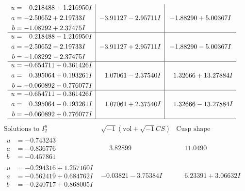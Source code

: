 \documentclass[1p]{elsarticle_modified}
\theoremstyle{definition}
\newcommand{\I}{\sqrt{-1}}
\begin{document}
$$\begin{array}{c|c|c}
\begin{aligned}
u &= \phantom{-}0.218488 + 1.216950 I \\
a &= -2.50652 + 2.19733 I \\
b &= -1.08292 + 2.37475 I\end{aligned}
 & -3.91127 - 2.95711 I & -1.88290 + 5.00367 I \\ \hline\begin{aligned}
u &= \phantom{-}0.218488 - 1.216950 I \\
a &= -2.50652 - 2.19733 I \\
b &= -1.08292 - 2.37475 I\end{aligned}
 & -3.91127 + 2.95711 I & -1.88290 - 5.00367 I \\ \hline\begin{aligned}
u &= -0.654711 + 0.361426 I \\
a &= \phantom{-}0.395064 + 0.193261 I \\
b &= -0.060892 - 0.776077 I\end{aligned}
 & \phantom{-}1.07061 - 2.37540 I & \phantom{-}1.32666 + 13.27884 I \\ \hline\begin{aligned}
u &= -0.654711 - 0.361426 I \\
a &= \phantom{-}0.395064 - 0.193261 I \\
b &= -0.060892 + 0.776077 I\end{aligned}
 & \phantom{-}1.07061 + 2.37540 I & \phantom{-}1.32666 - 13.27884 I\\
 \hline 
 \end{array}$$\newpage$$\begin{array}{c|c|c}  
\text{Solutions to }I^u_{2}& \I (\text{vol} + \sqrt{-1}CS) & \text{Cusp shape}\\
 \hline 
\begin{aligned}
u &= -0.743243\phantom{ +0.000000I} \\
a &= -0.836776\phantom{ +0.000000I} \\
b &= -0.457861\phantom{ +0.000000I}\end{aligned}
 & \phantom{-}3.82899\phantom{ +0.000000I} & \phantom{-}11.0490\phantom{ +0.000000I} \\ \hline\begin{aligned}
u &= -0.294316 + 1.257160 I \\
a &= -0.562419 + 0.684762 I \\
b &= -0.240717 + 0.868005 I\end{aligned}
 & -0.03821 - 3.75384 I & \phantom{-}6.23391 + 3.06632 I \\ \hline\begin{aligned}

\end{aligned}
\end{array}$$
\end{document}
